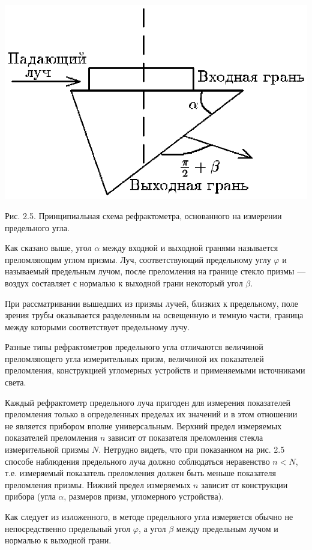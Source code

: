 \vskip 3mm
\centerline{\hbox{\includegraphics[scale=0.7]{Ris/ris_eps/ris2_05.eps}}}

\leftskip 0cm\centerline{\ris Рис. 2.5. Принципиальная схема
рефрактометра, основанного на измерении предельного угла.} \vskip
2mm Как сказано выше, угол $\alpha$ между входной и выходной
гранями называется преломляющим углом призмы. Луч, соответствующий
предельному углу $\varphi$ и называемый предельным лучом, после
преломления на границе стекло призмы --- воздух составляет с
нормалью к выходной грани некоторый угол $\beta$.

При рассматривании вышедших из призмы лучей, близких к
предельному, поле зрения трубы оказывается разделенным на
освещенную и темную части, граница между которыми соответствует
предельному лучу.

Разные типы рефрактометров предельного угла отличаются величиной
преломляющего угла измерительных призм, величиной их показателей
преломления, конструкцией угломерных устройств и применяемыми
источниками света.

Каждый рефрактометр предельного луча пригоден для измерения
показателей преломления только в определенных пределах их значений
и в этом отношении не является прибором вполне универсальным.
Верхний предел измеряемых показателей преломления $n$ зависит от
показателя преломления стекла измерительной призмы $N$. Нетрудно
видеть, что при показанном на рис. 2.5 способе наблюдения
предельного луча должно соблюдаться неравенство $n<N$, т.е.
измеряемый показатель преломления должен быть меньше показателя
преломления призмы. Нижний предел измеряемых $n$ зависит от
конструкции прибора (угла $\alpha$, размеров призм, угломерного
устройства).

Как следует из изложенного, в методе предельного угла измеряется
обычно не непосредственно предельный угол $\varphi$, а угол
$\beta$ между предельным лучом и нормалью к выходной грани.

